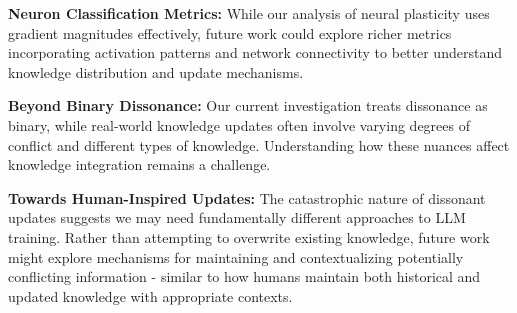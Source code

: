 \noindent \textbf{Neuron Classification Metrics:} 
While our analysis of neural plasticity uses gradient magnitudes effectively, future work could explore richer metrics incorporating activation patterns and network connectivity to better understand knowledge distribution and update mechanisms.

\noindent \textbf{Beyond Binary Dissonance:} 
Our current investigation treats dissonance as binary, while real-world knowledge updates often involve varying degrees of conflict and different types of knowledge. Understanding how these nuances affect knowledge integration remains a challenge.

\noindent \textbf{Towards Human-Inspired Updates:} 
The catastrophic nature of dissonant updates suggests we may need fundamentally different approaches to LLM training. Rather than attempting to overwrite existing knowledge, future work might explore mechanisms for maintaining and contextualizing potentially conflicting information - similar to how humans maintain both historical and updated knowledge with appropriate contexts.







